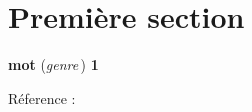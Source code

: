 
\section{Première section}

{\bf mot} ({\it genre}\,) {\bf 1}\ \ 

 \label{labelSite2}

Réference : \cite{nomSite2}
